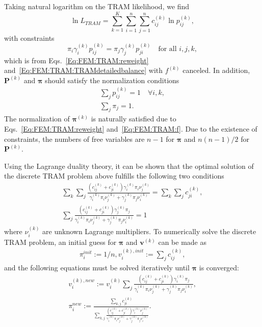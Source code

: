 Taking natural logarithm on the TRAM likelihood, we find
\begin{equation}
    \ln{L_{TRAM}}=\sum_{k=1}^{K}\sum_{i=1}^n\sum_{j=1}^{n}c_{ij}^{(k)}\ln{p_{ij}^{(k)}},
\end{equation}
with constraints
\begin{equation}
    \pi_i\gamma_i^{(k)}p_{ij}^{(k)}=\pi_j\gamma_j^{(k)}p_{ji}^{(k)}\quad \text{for all }i,j,k,
\end{equation}
which is from Eqs.~\ref{Eq:FEM:TRAM:reweight} and~\ref{Eq:FEM:TRAM:TRAMdetailedbalance} with $f^{(k)}$ canceled. In addition, $\mathbf{P}^{(k)}$ and $\boldsymbol{\pi}$ should satisfy the normalization conditions
\begin{align}
	\sum_{j}p_{ij}^{(k)}=1 \quad \forall i,k,\\
	\sum_j \pi_j=1.
\end{align}
The normalization of $\boldsymbol{\pi}^{(k)}$ is naturally satisfied due to Eqs.~\ref{Eq:FEM:TRAM:reweight} and~\ref{Eq:FEM:TRAM:f}. Due to the existence of constraints, the numbers of free variables are $n-1$ for $\boldsymbol{\pi}$ and $n(n-1)/2$ for $\mathbf{P}^{(k)}$.

Using the Lagrange duality theory, it can be shown that the optimal solution of the discrete TRAM problem above fulfills the following two conditions
\begin{align}
	\sum_k\sum_j\frac{(c_{ij}^{(k)}+c_{ji}^{(k)})\gamma_i^{(k)}\pi_i\nu_j^{(k)}}{\gamma_i^{(k)}\pi_i\nu_j^{(k)}+\gamma_j^{(k)}\pi_j\nu_i^{(k)}}=\sum_k\sum_jc_{ji}^{(k)},\\
	\sum_j\frac{(c_{ij}^{(k)}+c_{ji}^{(k)})\gamma_j^{(k)}\pi_j}{\gamma_i^{(k)}\pi_i\nu_j^{(k)}+\gamma_j^{(k)}\pi_j\nu_i^{(k)}}=1
\end{align}
where $\nu_i^{(k)}$ are unknown Lagrange multipliers. To numerically solve the discrete TRAM problem, an initial guess for $\boldsymbol{\pi}$ and $\mathbf{v}^{(k)}$ can be made as
\begin{align}
	\pi_i^{init}:=1/n,
	v_i^{(k),init}:=\sum_j c_{ij}^{(k)},
\end{align}
and the following equations must be solved iteratively until $\boldsymbol{\pi}$ is converged:
\begin{align}
	v_i^{(k),new}:=v_i^{(k)}\sum_j \frac{(c_{ij}^{(k)}+c_{ji}^{(k)})\gamma_i^{(k)}\pi_j}{\gamma_i^{(k)}\pi_i\nu_j^{(k)}+\gamma_j^{(k)}\pi_j\nu_i^{(k)}},\\
	\pi_i^{new}:=\frac{\sum_{k,j}c_{ji}^{(k)}}{\sum_{k,j}\frac{(c_{ij}^{(k)}+c_{ji}^{(k)})\gamma_i^{(k)}\nu_j^{(k)}}{\gamma_i^{(k)}\pi_i\nu_j^{(k)}+\gamma_j^{(k)}\pi_j\nu_i^{(k)}}}.
\end{align}